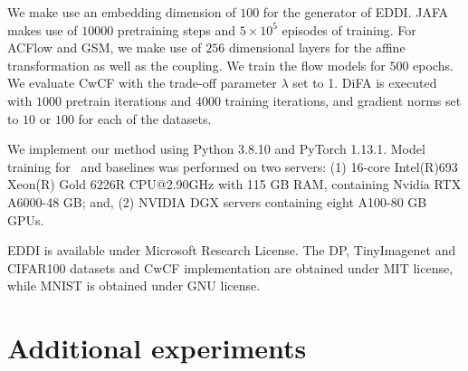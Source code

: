 \documentclass[letterpaper]{article}
\begin{document}
We make use an embedding dimension of $100$ for the generator of EDDI. JAFA makes use of $10000$ pretraining steps and $5\times 10^{5}$ episodes of training. For ACFlow and GSM, we make use of $256$ dimensional layers for the affine transformation as well as the coupling. We train the flow models for $500$ epochs. We evaluate CwCF with the trade-off parameter $\lambda$ set to 1. DiFA is executed with $1000$ pretrain iterations and $4000$ training iterations, and gradient norms set to $10$ or $100$ for each of the datasets.

We implement our method using Python 3.8.10 and PyTorch 1.13.1. Model training for \our\ and baselines was performed on two servers: (1) 16-core Intel(R)693
Xeon(R) Gold 6226R CPU@2.90GHz with 115 GB RAM,  containing Nvidia RTX A6000-48 GB; and,
(2) NVIDIA DGX servers containing eight A100-80 GB GPUs.

EDDI is available under Microsoft Research License. The DP, TinyImagenet and CIFAR100 datasets and CwCF implementation are obtained under MIT license, while MNIST is obtained under GNU license.

\newpage
\section{Additional experiments}
\label{app:exp}
\end{document}

